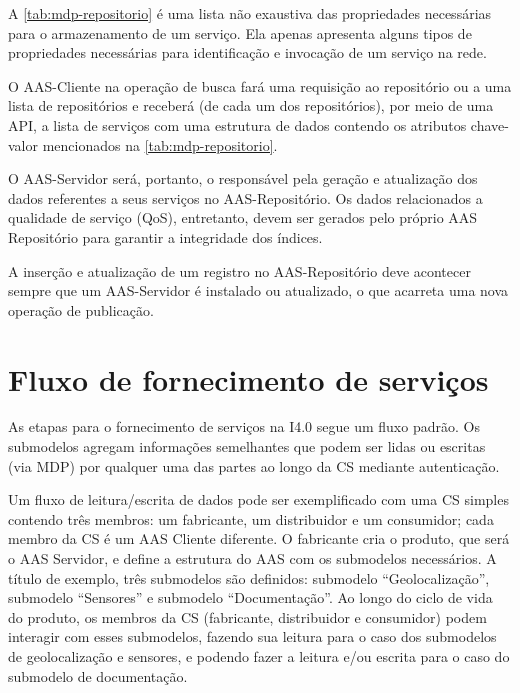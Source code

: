 	A \autoref{tab:mdp-repositorio} é uma lista não exaustiva das propriedades necessárias para o armazenamento de um serviço. Ela apenas apresenta alguns tipos de propriedades necessárias para identificação e invocação de um serviço na rede.
	
	O AAS-Cliente na operação de busca fará uma requisição ao repositório ou a uma lista de repositórios e receberá (de cada um dos repositórios), por meio de uma API, a lista de serviços com uma estrutura de dados contendo os atributos chave-valor mencionados na \autoref{tab:mdp-repositorio}.
	
	O AAS-Servidor será, portanto, o responsável pela geração e atualização dos dados referentes a seus serviços no AAS-Repositório. Os dados relacionados a qualidade de serviço (QoS), entretanto, devem ser gerados pelo próprio AAS Repositório para garantir a integridade dos índices.
	
	A inserção e atualização de um registro no AAS-Repositório deve acontecer sempre que um AAS-Servidor é instalado ou atualizado, o que acarreta uma nova operação de publicação.
	

\section{Fluxo de fornecimento de serviços}

	As etapas para o fornecimento de serviços na I4.0 segue um fluxo padrão. Os submodelos agregam informações semelhantes que podem ser lidas ou escritas (via MDP) por qualquer uma das partes ao longo da CS mediante autenticação.
	
	Um fluxo de leitura/escrita de dados pode ser exemplificado com uma CS simples contendo três membros: um fabricante, um distribuidor e um consumidor; cada membro da CS é um AAS Cliente diferente. O fabricante cria o produto, que será o AAS Servidor, e define a estrutura do AAS com os submodelos necessários. A título de exemplo, três submodelos são definidos: submodelo ``Geolocalização'', submodelo ``Sensores'' e submodelo ``Documentação''. Ao longo do ciclo de vida do produto, os membros da CS (fabricante, distribuidor e consumidor) podem interagir com esses submodelos, fazendo sua leitura para o caso dos submodelos de geolocalização e sensores, e podendo fazer a leitura e/ou escrita para o caso do submodelo de documentação.
	
